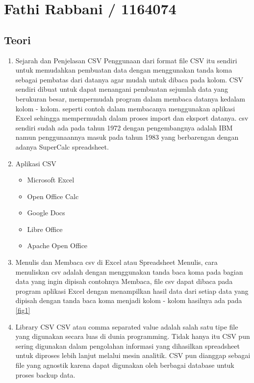 \section{Fathi Rabbani / 1164074}
\subsection{Teori}
\begin{enumerate}
\item Sejarah dan Penjelasan CSV
\subitem Penggunaan dari format file CSV itu sendiri untuk memudahkan pembuatan data dengan menggunakan tanda koma sebagai pembatas dari datanya agar mudah untuk dibaca pada kolom.
\subitem CSV sendiri dibuat untuk dapat menangani pembuatan sejumlah data yang berukuran besar, mempermudah program dalam membaca datanya kedalam kolom - kolom. seperti contoh dalam membacanya menggunakan aplikasi Excel sehingga mempermudah dalam proses import dan eksport datanya. csv sendiri sudah ada pada tahun 1972 dengan pengembangnya adalah IBM namun penggunaannya masuk pada tahun 1983 yang berbarengan dengan adanya SuperCalc spreadsheet.

\item Aplikasi CSV
\begin{itemize}
\item Microsoft Excel
\item Open Office Calc
\item Google Docs
\item Libre Office
\item Apache Open Office
\end{itemize}

\item Menulis dan Membaca csv di Excel atau Spreadsheet
\subitem Menulis, cara menuliskan csv adalah dengan menggunakan tanda baca koma pada bagian data yang ingin dipisah contohnya 
\subitem Membaca, file csv dapat dibaca pada program aplikasi Excel dengan menampilkan hasil data dari setiap data yang dipisah dengan tanda baca koma menjadi kolom - kolom hasilnya ada pada \ref{fig1}

\item Library CSV
\subitem CSV atau comma separated value adalah salah satu tipe file yang digunakan secara luas di dunia programming. Tidak hanya itu CSV pun sering digunakan dalam pengolahan informasi yang dihasilkan spreadsheet untuk diproses lebih lanjut melalui mesin analitik. CSV pun dianggap sebagai file yang agnostik karena dapat digunakan oleh berbagai database untuk proses backup data.


\end{enumerate}
